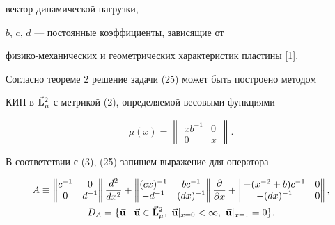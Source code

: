 \begin{exam}
вектор динамической нагрузки, 


$b$, $c$, $d$ --- постоянные коэффициенты, зависящие от 


физико-механических и геометрических характеристик пластины [1]. 


Согласно теореме 2 решение задачи (25) может быть построено методом 


КИП в $\Vec{\bold{L}}^2_\mu$ с метрикой (2), определяемой весовыми функциями 


$$ 


\mu(x)= 


\begin{Vmatrix} 


x b^{-1} & 0 \\ 0 & x 


\end{Vmatrix} 


. 


$$ 


В соответствии с (3), (25) запишем выражение для оператора 


\begin{gather*} 


A\equiv 


\begin{Vmatrix} 


c^{-1} & 0 \\ 0 & d^{-1} 


\end{Vmatrix} 


\frac{d^2}{dx^2}+ 


\begin{Vmatrix} 


(cx)^{-1} & bc^{-1} \\ -d^{-1} & (dx)^{-1} 


\end{Vmatrix} 


\frac{\partial}{\partial x}+ 


\begin{Vmatrix} 


-(x^{-2}+b)c^{-1} & 0 \\ -(dx)^{-1} & 0 


\end{Vmatrix} 


, \\ 


D_A=\{\vb{u}\mid\vb{u}\in\vb{L}^2_\mu, 


\ \vb{u}|_{x=0}<\infty,\ \vb{u}|_{x=1}=0\}. 


\end{gather*} 



\end{exam}
